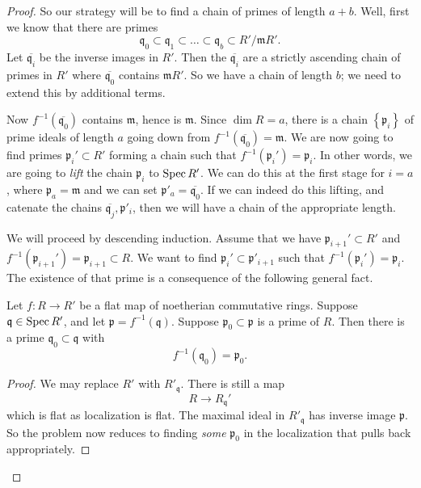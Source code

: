 \begin{proof}
So our strategy will be to find a chain of primes of length $a+b$. Well, first
we know that there are primes
\[ \mathfrak{q}_0 \subset \mathfrak{q}_1 \subset \dots \subset \mathfrak{q}_b
\subset R'/\mathfrak{m}R'.  \]
Let $\overline{\mathfrak{q}_i}$ be the inverse images in $R'$. Then the
$\overline{\mathfrak{q}_i}$ are a strictly ascending chain of primes in $R'$ where
$\overline{\mathfrak{q}_0}$ contains $\mathfrak{m}R'$. So we have a chain of
length $b$; we need to extend this by additional terms.

Now $f^{-1}(\overline{\mathfrak{q}_0})$ contains $\mathfrak{m}$, hence is
$\mathfrak{m}$. Since $\dim R = a$, there is a chain
$\left\{\mathfrak{p}_i\right\}$ of prime ideals of length
$a$ going down from $f^{-1}(\overline{\mathfrak{q}_0}) = \mathfrak{m}$. We are 
now going to find primes $\mathfrak{p}_i' \subset R'$ forming a chain such that
$f^{-1}(\mathfrak{p}_i') = \mathfrak{p}_i$. In other words, we are going to
\emph{lift} the chain $\mathfrak{p}_i$ to $\operatorname{Spec} R'$. We can do this at the
first stage for $i=a$, where $\mathfrak{p}_a = \mathfrak{m}$ and we can set
$\mathfrak{p}'_a = \overline{\mathfrak{q}_0}$. If we can indeed do this
lifting, and catenate the chains $\overline{\mathfrak{q}_j}, \mathfrak{p}'_i$,
then we will have a chain of the appropriate length.

We will proceed by descending induction. Assume that we have
$\mathfrak{p}_{i+1}' \subset R'$ and $f^{-1}(\mathfrak{p}_{i+1}') =
\mathfrak{p}_{i+1} \subset R$. We want to find $\mathfrak{p}_i' \subset
\mathfrak{p}'_{i+1}$ such that $f^{-1}(\mathfrak{p}_i') = \mathfrak{p}_i$. The
existence of that prime is a consequence of the following general fact.

\begin{theorem} Let $f: R \to R'$ be a flat map of
noetherian commutative
rings. Suppose $\mathfrak{q} \in \operatorname{Spec} R'$, and let $\mathfrak{p}
=f^{-1}(\mathfrak{q})$. Suppose $\mathfrak{p}_0 \subset \mathfrak{p}$ is a
prime of $R$. Then there is a prime $\mathfrak{q}_0 \subset \mathfrak{q}$ with 
\[ f^{-1}(\mathfrak{q}_0) = \mathfrak{p}_0.  \]
\end{theorem} 
\begin{proof} 
We may replace $R'$ with $R'_{\mathfrak{q}}$. There is still a map
\[ R \to R_{\mathfrak{q}}'  \]
which is flat as localization is flat. The maximal ideal in $R'_{\mathfrak{q}}$
has inverse image $\mathfrak{p}$. So the problem now reduces to finding
\emph{some} $\mathfrak{p}_0$ in the localization that pulls back appropriately.


\end{proof}
\end{proof}
